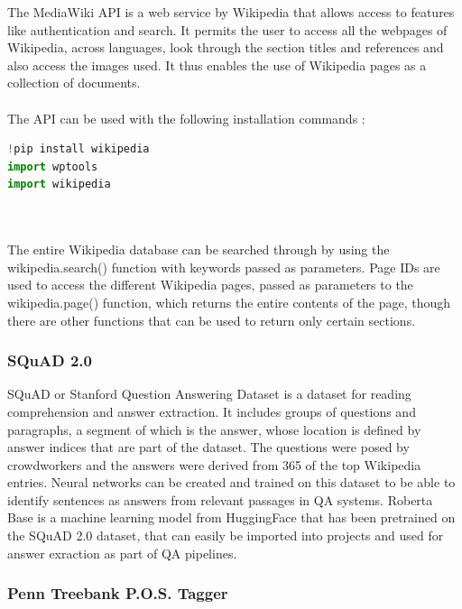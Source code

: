 \documentclass[12pt, a4paper]{article}
\begin{document}
The MediaWiki API is a web service by Wikipedia \cite{mediawiki} that allows access to features like authentication and search. It permits the user to access all the webpages of Wikipedia, across languages, look through the section titles and references and also access the images used. It thus enables the use of Wikipedia pages as a collection of documents. 
\\~\\ 
The API can be used with the following installation commands : 

\begin{lstlisting}[language = Python] 
!pip install wikipedia 
import wptools 
import wikipedia 
\end{lstlisting} 
\\~\\ 
The entire Wikipedia database can be searched through by using the wikipedia.search() function with keywords passed as parameters. Page IDs are used to access the different Wikipedia pages, passed as parameters to the wikipedia.page() function, which returns the entire contents of the page, though there are other functions that can be used to return only certain sections. 

\subsubsection{SQuAD 2.0} 

SQuAD or Stanford Question Answering Dataset is a dataset for reading comprehension and answer extraction. It includes groups of questions and paragraphs, a segment of which is the answer, whose location is defined by answer indices that are part of the dataset. The questions were posed by crowdworkers and the answers were derived from 365 of the top Wikipedia entries. \cite{squad} \cite{squadGit} Neural networks can be created and trained on this dataset to be able to identify sentences as answers from relevant passages in QA systems. Roberta Base is a machine learning model from HuggingFace that has been pretrained on the SQuAD 2.0 dataset, that can easily be imported into projects and used for answer exraction as part of QA pipelines. 

\subsubsection{Penn Treebank P.O.S. Tagger} 
\end{document}
